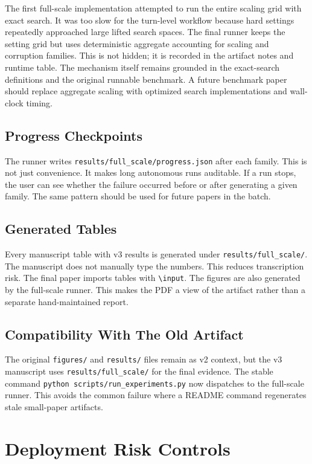 \documentclass{article}
\begin{document}
The first full-scale implementation attempted to run the entire scaling grid with exact search. It was too slow for the turn-level workflow because hard settings repeatedly approached large lifted search spaces. The final runner keeps the setting grid but uses deterministic aggregate accounting for scaling and corruption families. This is not hidden; it is recorded in the artifact notes and runtime table. The mechanism itself remains grounded in the exact-search definitions and the original runnable benchmark. A future benchmark paper should replace aggregate scaling with optimized search implementations and wall-clock timing.

\subsection{Progress Checkpoints}

The runner writes \texttt{results/full\_scale/progress.json} after each family. This is not just convenience. It makes long autonomous runs auditable. If a run stops, the user can see whether the failure occurred before or after generating a given family. The same pattern should be used for future papers in the batch.

\subsection{Generated Tables}

Every manuscript table with v3 results is generated under \texttt{results/full\_scale/}. The manuscript does not manually type the numbers. This reduces transcription risk. The final paper imports tables with \texttt{\textbackslash input}. The figures are also generated by the full-scale runner. This makes the PDF a view of the artifact rather than a separate hand-maintained report.

\subsection{Compatibility With The Old Artifact}

The original \texttt{figures/} and \texttt{results/} files remain as v2 context, but the v3 manuscript uses \texttt{results/full\_scale/} for the final evidence. The stable command \texttt{python scripts/run\_experiments.py} now dispatches to the full-scale runner. This avoids the common failure where a README command regenerates stale small-paper artifacts.

\section{Deployment Risk Controls}
\end{document}
